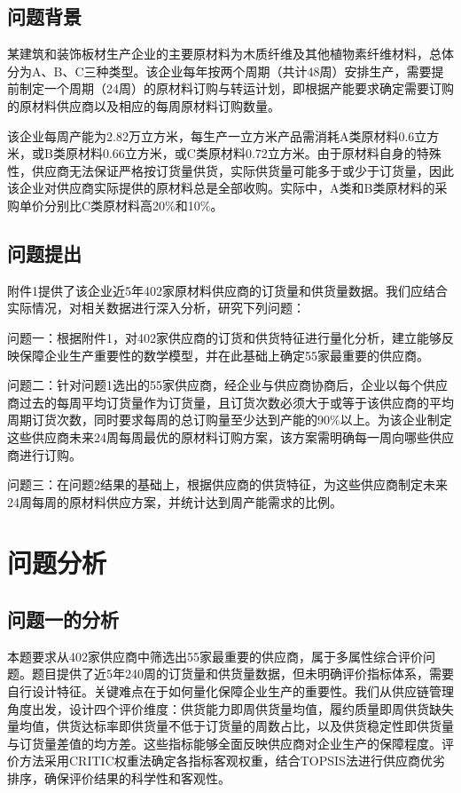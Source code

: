 \documentclass[12pt,a4paper]{ctexart}
\theoremstyle{definition}
\theoremstyle{plain}
\theoremstyle{remark}
\begin{document}
\subsection{问题背景}

某建筑和装饰板材生产企业的主要原材料为木质纤维及其他植物素纤维材料，总体分为A、B、C三种类型。该企业每年按两个周期（共计48周）安排生产，需要提前制定一个周期（24周）的原材料订购与转运计划，即根据产能要求确定需要订购的原材料供应商以及相应的每周原材料订购数量。

该企业每周产能为2.82万立方米，每生产一立方米产品需消耗A类原材料0.6立方米，或B类原材料0.66立方米，或C类原材料0.72立方米。由于原材料自身的特殊性，供应商无法保证严格按订货量供货，实际供货量可能多于或少于订货量，因此该企业对供应商实际提供的原材料总是全部收购。实际中，A类和B类原材料的采购单价分别比C类原材料高20\%和10\%。

\subsection{问题提出}

附件1提供了该企业近5年402家原材料供应商的订货量和供货量数据。我们应结合实际情况，对相关数据进行深入分析，研究下列问题：

问题一：根据附件1，对402家供应商的订货和供货特征进行量化分析，建立能够反映保障企业生产重要性的数学模型，并在此基础上确定55家最重要的供应商。

问题二：针对问题1选出的55家供应商，经企业与供应商协商后，企业以每个供应商过去的每周平均订货量作为订货量，且订货次数必须大于或等于该供应商的平均周期订货次数，同时要求每周的总订购量至少达到产能的90\%以上。为该企业制定这些供应商未来24周每周最优的原材料订购方案，该方案需明确每一周向哪些供应商进行订购。

问题三：在问题2结果的基础上，根据供应商的供货特征，为这些供应商制定未来24周每周的原材料供应方案，并统计达到周产能需求的比例。

\section{问题分析}

\subsection{问题一的分析}

本题要求从402家供应商中筛选出55家最重要的供应商，属于多属性综合评价问题。题目提供了近5年240周的订货量和供货量数据，但未明确评价指标体系，需要自行设计特征。关键难点在于如何量化保障企业生产的重要性。我们从供应链管理角度出发，设计四个评价维度：供货能力即周供货量均值，履约质量即周供货缺失量均值，供货达标率即供货量不低于订货量的周数占比，以及供货稳定性即供货量与订货量差值的均方差。这些指标能够全面反映供应商对企业生产的保障程度。评价方法采用CRITIC权重法确定各指标客观权重，结合TOPSIS法进行供应商优劣排序，确保评价结果的科学性和客观性。
\end{document}
